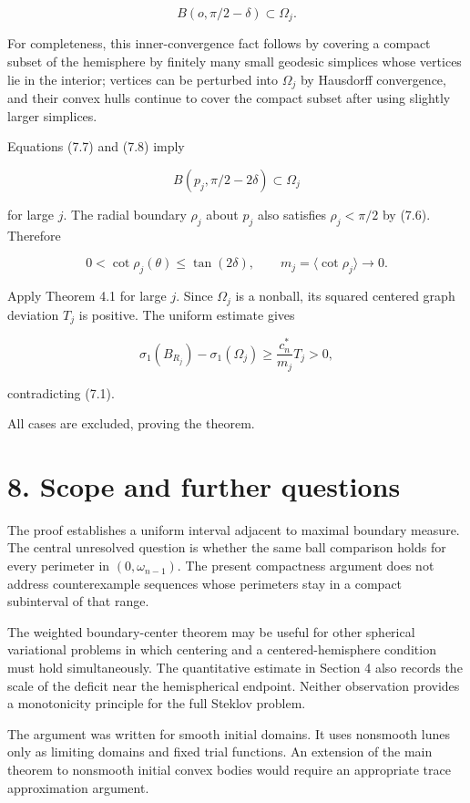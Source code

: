 \documentclass[11pt]{article}
\begin{document}
\[
B(o,\pi/2-\delta)\subset\Omega_j.
\tag{7.8}
\]

For completeness, this inner-convergence fact follows by covering a
compact subset of the hemisphere by finitely many small geodesic
simplices whose vertices lie in the interior; vertices can be perturbed
into \(\Omega_j\) by Hausdorff convergence, and their convex hulls
continue to cover the compact subset after using slightly larger
simplices.

Equations (7.7) and (7.8) imply

\[
B(p_j,\pi/2-2\delta)\subset\Omega_j
\tag{7.9}
\]

for large \(j\). The radial boundary \(\rho_j\) about \(p_j\) also
satisfies \(\rho_j<\pi/2\) by (7.6). Therefore

\[
0<\cot\rho_j(\theta)\leq\tan(2\delta),
\qquad
m_j=\langle\cot\rho_j\rangle\longrightarrow0.
\tag{7.10}
\]

Apply Theorem 4.1 for large \(j\). Since \(\Omega_j\) is a nonball, its
squared centered graph deviation \(T_j\) is positive. The uniform
estimate gives

\[
\sigma_1(B_{R_j})-\sigma_1(\Omega_j)
\geq\frac{c_n^*}{m_j}T_j>0,
\tag{7.11}
\]

contradicting (7.1).

All cases are excluded, proving the theorem.

\section{8. Scope and further
questions}\label{scope-and-further-questions}

The proof establishes a uniform interval adjacent to maximal boundary
measure. The central unresolved question is whether the same ball
comparison holds for every perimeter in \((0,\omega_{n-1})\). The
present compactness argument does not address counterexample sequences
whose perimeters stay in a compact subinterval of that range.

The weighted boundary-center theorem may be useful for other spherical
variational problems in which centering and a centered-hemisphere
condition must hold simultaneously. The quantitative estimate in Section
4 also records the scale of the deficit near the hemispherical endpoint.
Neither observation provides a monotonicity principle for the full
Steklov problem.

The argument was written for smooth initial domains. It uses nonsmooth
lunes only as limiting domains and fixed trial functions. An extension
of the main theorem to nonsmooth initial convex bodies would require an
appropriate trace approximation argument.
\end{document}

